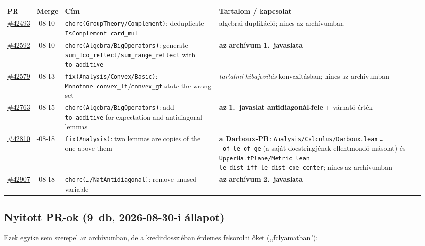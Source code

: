 \documentclass[11pt,a4paper]{article}
\newcommand{\lean}[1]{\texttt{\small #1}}
\newcommand{\bk}{\allowbreak}
\newcommand{\pr}[1]{\href{https://github.com/leanprover-community/mathlib4/pull/#1}{\##1}}
\begin{document}
\begingroup
\small
\begin{longtable}{@{}>{\raggedright\arraybackslash}p{1.3cm}>{\raggedright\arraybackslash}p{1.6cm}>{\raggedright\arraybackslash}p{6.3cm}>{\raggedright\arraybackslash}p{5.2cm}@{}}
\toprule
\textbf{PR} & \textbf{Merge} & \textbf{Cím} & \textbf{Tartalom / kapcsolat}\\
\midrule
\endfirsthead
\bottomrule
\endfoot
\pr{42493} & 2026-08-10 & \lean{chore(GroupTheory/\bk Complement)}: deduplicate \lean{IsComplement.\bk card\_\bk mul} & algebrai duplikáció; nincs az archívumban\\
\addlinespace
\pr{42592} & 2026-08-10 & \lean{chore(Algebra/\bk BigOperators)}: generate \lean{sum\_\bk Ico\_\bk reflect}/\lean{sum\_\bk range\_\bk reflect} with \lean{to\_\bk additive} & \textbf{az archívum 1.\ javaslata}\\
\addlinespace
\pr{42579} & 2026-08-13 & \lean{fix(Analysis/\bk Convex/\bk Basic)}: \lean{Monotone.\bk convex\_\bk lt}/\lean{convex\_\bk gt} state the wrong set & \emph{tartalmi hibajavítás} konvexitásban; nincs az archívumban\\
\addlinespace
\pr{42763} & 2026-08-15 & \lean{chore(Algebra/\bk BigOperators)}: add \lean{to\_\bk additive} for expectation and antidiagonal lemmas & \textbf{az 1.\ javaslat antidiagonál-fele} + várható érték\\
\addlinespace
\pr{42810} & 2026-08-18 & \lean{fix(Analysis)}: two lemmas are copies of the one above them & \textbf{a Darboux-PR}: \lean{Analysis/\bk Calculus/\bk Darboux.\bk lean} \lean{\dots\_\bk of\_\bk le\_\bk of\_\bk ge} (a saját docstringjének ellentmondó másolat) és \lean{UpperHalfPlane/\bk Metric.\bk lean} \lean{le\_\bk dist\_\bk iff\_\bk le\_\bk dist\_\bk coe\_\bk center}; nincs az archívumban\\
\addlinespace
\pr{42907} & 2026-08-18 & \lean{chore(\dots/\bk NatAntidiagonal)}: remove unused variable & \textbf{az archívum 2.\ javaslata}\\
\end{longtable}
\endgroup

\subsection{Nyitott PR-ok (9~db, 2026-08-30-i állapot)}

Ezek egyike sem szerepel az archívumban, de a kreditdossziéban érdemes
felsorolni őket (,,folyamatban''):
\end{document}
